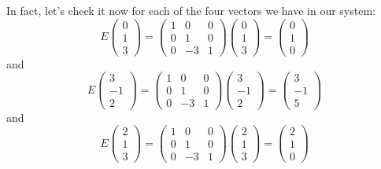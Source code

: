 \documentclass[10pt,]{book}
\theoremstyle{plain}
\numberwithin{equation}{section}
\begin{document}
        In fact, let's check it now for each of the four vectors we have in our system:
        \[
          E \begin{pmatrix} 0 \\ 1 \\ 3 \end{pmatrix} =
          \begin{pmatrix} 1 &0 &0 \\ 0 &1 &0 \\
          0 &-3 &1 \end{pmatrix} \begin{pmatrix} 0 \\ 1 \\ 3 \end{pmatrix}
          = \begin{pmatrix} 0 \\ 1 \\ 0 \end{pmatrix}
        \]
        and
        \[
          E \begin{pmatrix} 3 \\ -1 \\ 2 \end{pmatrix} =
          \begin{pmatrix} 1 &0 &0 \\ 0 &1 &0 \\ 0 &-3
          &1 \end{pmatrix} \begin{pmatrix} 3 \\ -1 \\ 2 \end{pmatrix} =
          \begin{pmatrix} 3 \\ -1 \\ 5 \end{pmatrix}
        \]
        and
        \[
          E \begin{pmatrix} 2 \\ 1 \\ 3 \end{pmatrix} =
          \begin{pmatrix} 1 &0 &0 \\ 0 &1 &0 \\
          0 &-3 &1 \end{pmatrix} \begin{pmatrix} 2 \\ 1 \\ 3
          \end{pmatrix} = \begin{pmatrix} 2 \\ 1 \\ 0 \end{pmatrix}
        \]
\end{document}
